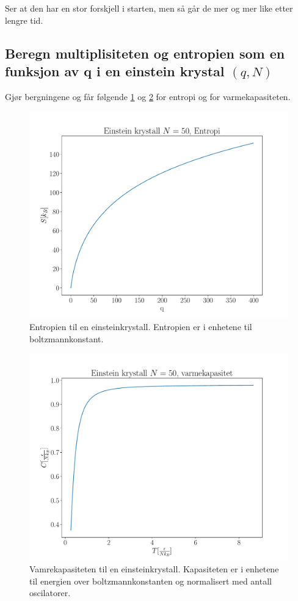 \documentclass[ reprint, amsmath,amssymb, aps]{revtex4-2}
\begin{document}
Ser at den har en stor forskjell i starten, men så går de mer og mer like etter lengre tid.

\subsection*{Beregn multiplisiteten og entropien som en funksjon av q i en einstein krystal $(q, N)$}

Gjør bergningene og får følgende \ref{lavTS} og \ref{lavTC} for entropi og for varmekapasiteten.

\begin{figure}
\centering
\includegraphics[scale=0.35]{lavTS.pdf}
\caption{Entropien til en einsteinkrystall. Entropien er i enhetene til boltzmannkonstant.}
\label{lavTS}
\end{figure}


\begin{figure}
\centering
\includegraphics[scale=0.35]{lavTC.pdf}
\caption{Vamrekapasiteten til en einsteinkrystall. Kapasiteten er i enhetene til energien over boltzmannkonstanten og normalisert med antall oscilatorer.}
\label{lavTC}
\end{figure}
\end{document}
